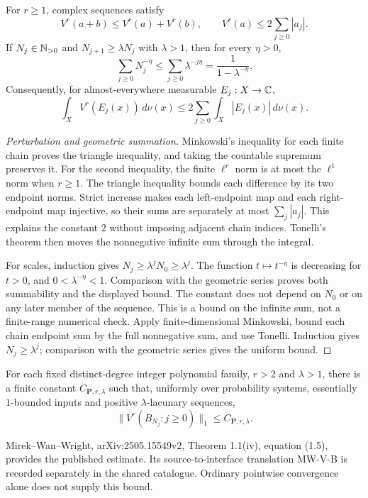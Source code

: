 \begin{auxlemma}\label{l:variation-perturbation}
\leanok
For $r\geq1$, complex sequences satisfy
\[
 V^r(a+b)\leq V^r(a)+V^r(b),\qquad
 V^r(a)\leq2\sum_{j\geq0}|a_j|.
\]
If $N_j\in\mathbb N_{>0}$ and $N_{j+1}\geq\lambda N_j$ with
$\lambda>1$, then for every $\eta>0$,
\[
 \sum_{j\geq0}N_j^{-\eta}
 \leq\sum_{j\geq0}\lambda^{-j\eta}
 =\frac1{1-\lambda^{-\eta}}.
\]
Consequently, for almost-everywhere measurable $E_j:X\to\mathbb C$,
\[
 \int_X V^r(E_j(x))\,d\nu(x)
 \leq2\sum_{j\geq0}\int_X |E_j(x)|\,d\nu(x).
\]
\end{auxlemma}
\begin{proof}[Perturbation and geometric summation]
\leanok
\ifDetailed
Minkowski's inequality for each finite chain proves the triangle
inequality, and taking the countable supremum preserves it. For the
second inequality, the finite $\ell^r$ norm is at most the $\ell^1$ norm
when $r\geq1$. The triangle inequality bounds each difference by its two
endpoint norms. Strict increase makes each left-endpoint map and each
right-endpoint map injective, so their sums are separately at most
$\sum_j|a_j|$. This explains the constant $2$ without imposing adjacent
chain indices. Tonelli's theorem then moves the nonnegative infinite sum
through the integral.

For scales, induction gives $N_j\geq\lambda^jN_0\geq\lambda^j$.
The function $t\mapsto t^{-\eta}$ is decreasing for $t>0$, and
$0<\lambda^{-\eta}<1$. Comparison with the geometric series proves both
summability and the displayed bound. The constant does not depend on
$N_0$ or on any later member of the sequence. This is a bound on the
infinite sum, not a finite-range numerical check.
\else
Apply finite-dimensional Minkowski, bound each chain endpoint sum by the
full nonnegative sum, and use Tonelli. Induction gives $N_j\geq\lambda^j$;
comparison with the geometric series gives the uniform bound.
\fi
\end{proof}

\begin{inputthm}\label{input:MWV}
For each fixed distinct-degree integer polynomial family, $r>2$ and
$\lambda>1$, there is a finite constant $C_{\mathbf P,r,\lambda}$ such
that, uniformly over probability systems, essentially $1$-bounded inputs
and positive $\lambda$-lacunary sequences,
\[
 \|V^r(B_{N_j}:j\geq0)\|_1\leq C_{\mathbf P,r,\lambda}.
\]
\end{inputthm}
Mirek--Wan--Wright, arXiv:2505.15549v2, Theorem 1.1(iv), equation (1.5),
provides the published estimate. Its source-to-interface translation
MW-V-B is recorded separately in the shared catalogue. Ordinary pointwise
convergence alone does not supply this bound.

